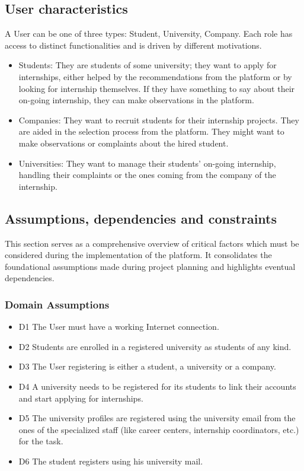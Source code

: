 \documentclass{article}
\begin{document}
\subsection{User characteristics}
     A User can be one of three types: Student, University, Company. Each role has access to distinct functionalities and is driven by different motivations.
     \begin{itemize}
        \item Students: They are students of some university; they want to apply for internships, either helped by the recommendations from the platform or by looking for internship themselves. If they have something to say about their on-going internship, they can make observations in the platform.
        \item Companies: They want to recruit students for their internship projects. They are aided in the selection process from the platform. They might want to make observations or complaints about the hired student.
        \item Universities: They want to manage their students' on-going internship, handling their complaints or the ones coming from the company of the internship.     
     \end{itemize}
\subsection{Assumptions, dependencies and constraints}
This section serves as a comprehensive overview of critical factors which must be considered during the implementation of the platform. It consolidates the foundational assumptions made during project planning and highlights eventual dependencies.
\subsubsection{Domain Assumptions}
    \begin{itemize}
        \item D1 The User must have a working Internet connection.
        \item D2 Students are enrolled in a registered university as students of any kind.
        \item D3 The User registering is either a student, a university or a company.
        \item D4 A university needs to be registered for its students to link their accounts and start applying for internships.
        \item D5 The university profiles are registered using the university email from the ones of the specialized staff (like career centers, internship coordinators, etc.) for the task.
        \item D6 The student registers using his university mail.

    \end{itemize}
\end{document}
